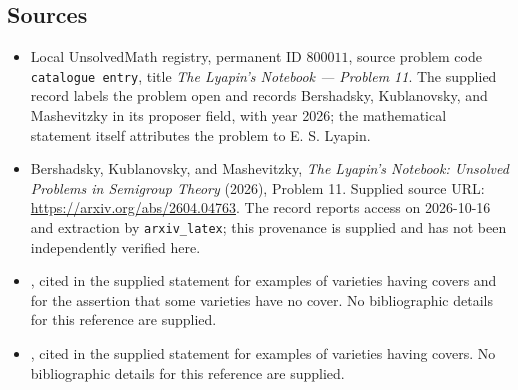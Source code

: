 \documentclass[11pt]{article}
\begin{document}
\subsection{Sources}
\begin{itemize}
\item Local UnsolvedMath registry, permanent ID \(800011\), source problem code \texttt{catalogue entry}, title \emph{The Lyapin's Notebook --- Problem 11}. The supplied record labels the problem open and records Bershadsky, Kublanovsky, and Mashevitzky in its proposer field, with year 2026; the mathematical statement itself attributes the problem to E. S. Lyapin.
\item Bershadsky, Kublanovsky, and Mashevitzky, \emph{The Lyapin's Notebook: Unsolved Problems in Semigroup Theory} (2026), Problem 11. Supplied source URL: \url{https://arxiv.org/abs/2604.04763}. The record reports access on 2026-10-16 and extraction by \texttt{arxiv\_latex}; this provenance is supplied and has not been independently verified here.
\item [Mak2], cited in the supplied statement for examples of varieties having covers and for the assertion that some varieties have no cover. No bibliographic details for this reference are supplied.
\item [Mak3], cited in the supplied statement for examples of varieties having covers. No bibliographic details for this reference are supplied.
\end{itemize}
\end{document}
